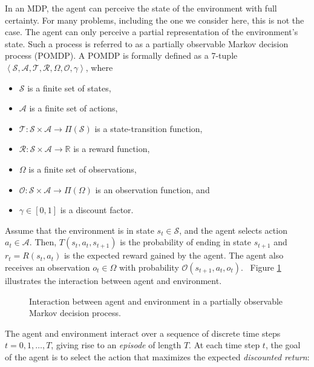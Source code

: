 In an MDP, the agent can perceive the state of the environment with full certainty.
For many problems, including the one we consider here, this is not the case.
The agent can only perceive a partial representation of the environment's state.
Such a process is referred to as a partially observable Markov decision process (POMDP).
A POMDP is formally defined as a 7-tuple \(\left\langle \mathcal{S}, \mathcal{A}, \mathcal{T}, \mathcal{R}, \Omega, \mathcal{O}, \gamma \right\rangle\), where

\begin{itemize}
    \item \(\mathcal{S}\) is a finite set of states,
    \item \(\mathcal{A}\) is a finite set of actions,
    \item \(\mathcal{T}: \mathcal{S} \times \mathcal{A} \rightarrow \Pi(\mathcal{S})\) is a state-transition function,
    \item \(\mathcal{R}: \mathcal{S} \times \mathcal{A} \rightarrow \mathbb{R}\) is a reward function,
    \item \(\Omega\) is a finite set of observations,
    \item \(\mathcal{O}: \mathcal{S} \times \mathcal{A} \rightarrow \Pi(\Omega)\) is an observation function, and
    \item \(\gamma \in [0, 1]\) is a discount factor.
\end{itemize}

Assume that the environment is in state \(s_t \in \mathcal{S}\), and the agent selects action \(a_t \in \mathcal{A}\).
Then, \(T(s_t, a_t, s_{t+1})\) is the probability of ending in state \(s_{t+1}\) and \(r_t = R(s_t, a_t)\) is the expected reward gained by the agent.
The agent also receives an observation \(o_t \in \Omega\) with probability \(\mathcal{O}(s_{t+1}, a_t, o_t)\).~\cite{kaelbling_pomdp_1998}
Figure \ref{fig:pomdp} illustrates the interaction between agent and environment.

\begin{figure}
    \centering
    
    \label{fig:pomdp}
    \caption[Partially observable Markov decision process]{Interaction between agent and environment in a partially observable Markov decision process.}
\end{figure}

The agent and environment interact over a sequence of discrete time steps \(t = 0, 1, \dots, T\), giving rise to an \textit{episode} of length \(T\).
At each time step \(t\), the goal of the agent is to select the action that maximizes the expected \textit{discounted return}:

